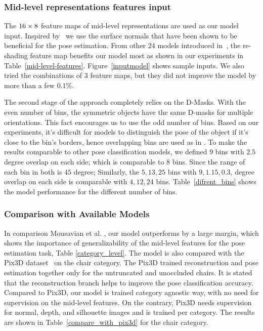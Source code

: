 \documentclass[letterpaper, 10 pt, conference]{ieeeconf}  \pdfoutput=1
\begin{document}
\subsubsection{Mid-level representations features input}
\label{mid_dif_input}
The $16 \time 16 \times 8$ feature maps of mid-level representations are used as our model input. 
Inspired by~\cite{marrnet, pix3d} we use the surface normals that have been shown to be beneficial for the pose estimation. From other $24$ models introduced in~\cite{taskonomy2018}, the re-shading feature map benefits our model most as shown in our experiments in Table~\ref{mid-level-features}. Figure~\ref{inputmodel} shows sample inputs. We also tried the combinations of $3$ feature maps, but they did not improve the model by more than a few $0.1\%$. 

The second stage of the approach completely relies on the D-Masks. With the even number of bins, the symmetric objects have the same D-masks for multiple orientations. This fact encourages us to use the odd number of bins. Based on our experiments, it's difficult for models to distinguish the pose of the object if it's close to the bin's borders, hence overlapping bins are used as in \cite{mousavian20173d}. 
To make the results comparable to other pose classification models, we defined $9$ bins with $2.5$ degree overlap on each side; which is comparable to $8$ bins. Since the range of each bin in both is $45$ degree; Similarly, the $5,13,25$ bins with $9,1.15,0.3$, degree overlap on each side is comparable with $4,12,24$ bins. Table~\ref{difrent_bins} shows the model performance for the different number of bins.

\subsubsection{Comparison with Available Models}
In comparison Mousavian et al. \cite{mousavian20173d}, our model outperforms by a large margin, which shows the importance of generalizability of the mid-level features for the pose estimation task, Table \ref{category_level}. The model is also compared with the Pix3D dataset~\cite{pix3d} on the chair category. The Pix3D trained reconstruction and pose estimation together only for the untruncated and unoccluded chairs. It is stated that the reconstruction branch helps to improve the pose classification accuracy. Compared to Pix3D, our model is trained category agnostic way, with no need for supervision on the mid-level features. On the contrary, Pix3D needs supervision for normal, depth, and silhouette images and is trained per category. The results are shown in Table~\ref{compare_with_pix3d} for the chair category.
\end{document}
